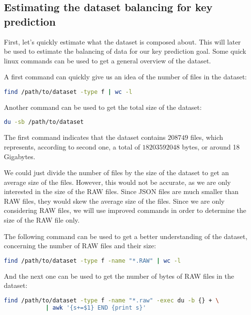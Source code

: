    \subsection{Estimating the dataset balancing for key prediction}
    First, let's quickly estimate what the dataset is composed about. This will later be used to estimate the balancing of data for our key prediction goal. Some quick linux commands can be used to get a general overview of the dataset.
    
    A first command can quickly give us an idea of the number of files in the dataset:
    \begin{lstlisting}[caption={Count all dataset files}, label=methods:code:count_all_dataset_files, language=bash]
        find /path/to/dataset -type f | wc -l
    \end{lstlisting}

    Another command can be used to get the total size of the dataset:
    \begin{lstlisting}[caption={Get the total size of the dataset}, label=methods:code:get_total_size_dataset, language=bash]
        du -sb /path/to/dataset
    \end{lstlisting}

    The first command indicates that the dataset contains $ 208749 $ files, which represents, according to second one, a total of $ 18203592048 $ bytes, or around 18 Gigabytes.

    We could just divide the number of files by the size of the dataset to get an average size of the files. However, this would not be accurate, as we are only interested in the size of the RAW files. Since JSON files are much smaller than RAW files, they would skew the average size of the files. Since we are only considering RAW files, we will use improved commands in order to determine the size of the RAW file only.

    The following command can be used to get a better understanding of the dataset, concerning the number of RAW files and their size:

    \begin{lstlisting}[caption={Find the number of RAW files in the dataset}, language=bash]
        find /path/to/dataset -type f -name "*.RAW" | wc -l
    \end{lstlisting}

    And the next one can be used to get the number of bytes of RAW files in the dataset:

    \begin{lstlisting}[caption={Find the number of bytes of RAW files in the dataset}, language=bash]
        find /path/to/dataset -type f -name "*.raw" -exec du -b {} + \
            | awk '{s+=$1} END {print s}'
    \end{lstlisting}

